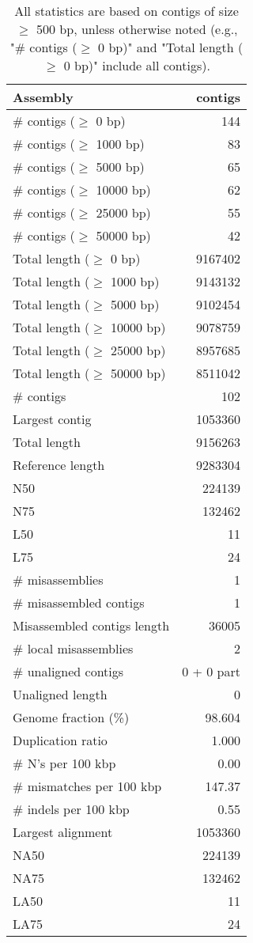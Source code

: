 \documentclass[12pt,a4paper]{article}
\begin{document}
\begin{table}[ht]
\begin{center}
\caption{All statistics are based on contigs of size $\geq$ 500 bp, unless otherwise noted (e.g., "\# contigs ($\geq$ 0 bp)" and "Total length ($\geq$ 0 bp)" include all contigs).}
\begin{tabular}{|l*{1}{|r}|}
\hline
Assembly & contigs \\ \hline
\# contigs ($\geq$ 0 bp) & 144 \\ \hline
\# contigs ($\geq$ 1000 bp) & 83 \\ \hline
\# contigs ($\geq$ 5000 bp) & 65 \\ \hline
\# contigs ($\geq$ 10000 bp) & 62 \\ \hline
\# contigs ($\geq$ 25000 bp) & 55 \\ \hline
\# contigs ($\geq$ 50000 bp) & 42 \\ \hline
Total length ($\geq$ 0 bp) & 9167402 \\ \hline
Total length ($\geq$ 1000 bp) & 9143132 \\ \hline
Total length ($\geq$ 5000 bp) & 9102454 \\ \hline
Total length ($\geq$ 10000 bp) & 9078759 \\ \hline
Total length ($\geq$ 25000 bp) & 8957685 \\ \hline
Total length ($\geq$ 50000 bp) & 8511042 \\ \hline
\# contigs & 102 \\ \hline
Largest contig & 1053360 \\ \hline
Total length & 9156263 \\ \hline
Reference length & 9283304 \\ \hline
N50 & 224139 \\ \hline
N75 & 132462 \\ \hline
L50 & 11 \\ \hline
L75 & 24 \\ \hline
\# misassemblies & 1 \\ \hline
\# misassembled contigs & 1 \\ \hline
Misassembled contigs length & 36005 \\ \hline
\# local misassemblies & 2 \\ \hline
\# unaligned contigs & 0 + 0 part \\ \hline
Unaligned length & 0 \\ \hline
Genome fraction (\%) & 98.604 \\ \hline
Duplication ratio & 1.000 \\ \hline
\# N's per 100 kbp & 0.00 \\ \hline
\# mismatches per 100 kbp & 147.37 \\ \hline
\# indels per 100 kbp & 0.55 \\ \hline
Largest alignment & 1053360 \\ \hline
NA50 & 224139 \\ \hline
NA75 & 132462 \\ \hline
LA50 & 11 \\ \hline
LA75 & 24 \\ \hline
\end{tabular}
\end{center}
\end{table}
\end{document}
